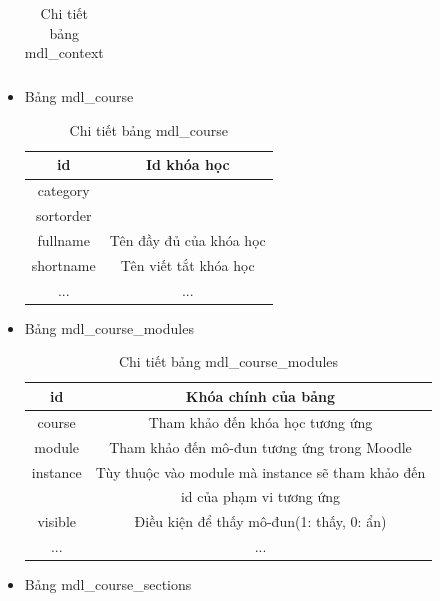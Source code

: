 \begin{itemize}
\begin{center}
\begin{table}[!htp]
\begin{tabular}{|c|c|}
			\end{tabular} 
			\caption{Chi tiết bảng mdl\_context}
			\label{bang6}
		\end{table}
	\end{center}
	\item Bảng mdl\_course
	\begin{center}
		\begin{table}[!htp]
			\centering
			\begin{tabular}{|c|c|}
				\hline 
				id & Id khóa học \\ 
				\hline 
				category &  \\ 
				\hline 
				sortorder &  \\ 
				\hline 
				fullname & Tên đầy đủ của khóa học \\ 
				\hline 
				shortname & Tên viết tắt khóa học \\ 
				\hline 
				... & ... \\
				\hline
			\end{tabular} 
			\caption{Chi tiết bảng mdl\_course}
			\label{bang7}
		\end{table}
	\end{center}
	\newpage
	\item Bảng mdl\_course\_modules
	\begin{center}
		\begin{table}[!htp]
			\centering
			\begin{tabular}{|c|c|}
				\hline 
				id & Khóa chính của bảng \\ 
				\hline 
				course & Tham khảo đến khóa học tương ứng \\ 
				\hline 
				module & Tham khảo đến mô-đun tương ứng trong Moodle \\ 
				\hline 
				instance & Tùy thuộc vào module mà instance sẽ tham khảo đến \\ & id của phạm vi tương ứng \\  
				\hline 
				visible & Điều kiện để thấy mô-đun(1: thấy, 0: ẩn) \\  
				\hline 
				... & ... \\ 
				\hline 
			\end{tabular}
			\caption{Chi tiết bảng mdl\_course\_modules}
			\label{bang8}
		\end{table}
	\end{center}
	\item Bảng mdl\_course\_sections
	\begin{center}
		\begin{table}[!htp]
			\centering

\end{table}
\end{center}
\end{itemize}
